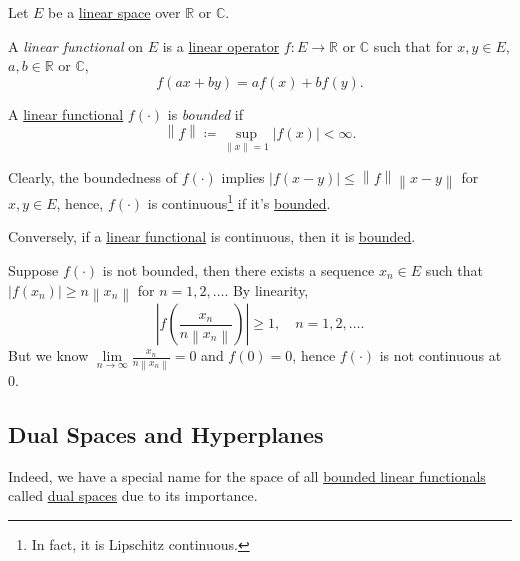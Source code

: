 \begin{definition*}
	Let \(E\) be a \hyperref[def:linear-vector-space]{linear space} over \(\mathbb{R} \) or \(\mathbb{C} \).
	\begin{definition}\label{def:linear-functional}
		A \emph{linear functional} on \(E\) is a \hyperref[def:linear-op]{linear operator} \(f\colon E\to \mathbb{R} \) or \(\mathbb{C} \) such that for \(x, y\in E\), \(a, b\in \mathbb{R} \) or \(\mathbb{C} \),
		\[
			f(ax + by) = af(x) + bf(y).
		\]
	\end{definition}
	\begin{definition}\label{def:bounded-linear-functional}
		A \hyperref[def:linear-functional]{linear functional} \(f(\cdot)\) is \emph{bounded} if
		\[
			\left\lVert f\right\rVert \coloneqq \sup _{\left\lVert x\right\rVert = 1}\left\vert f(x) \right\vert  < \infty.
		\]
	\end{definition}
\end{definition*}

Clearly, the boundedness of \(f(\cdot)\) implies \(\left\vert f(x-y) \right\vert \leq \left\lVert f\right\rVert \left\lVert x-y\right\rVert \) for \(x, y\in E\), hence, \(f(\cdot)\) is continuous\footnote{In fact, it is Lipschitz continuous.} if it's \hyperref[def:bounded-linear-functional]{bounded}.

\begin{remark}
	Conversely, if a \hyperref[def:linear-functional]{linear functional} is continuous, then it is \hyperref[def:bounded-linear-functional]{bounded}.
\end{remark}
\begin{explanation}
	Suppose \(f(\cdot)\) is not bounded, then there exists a sequence \(x_n\in E\) such that \(\left\vert f(x_n) \right\vert \geq n \left\lVert x_n\right\rVert \) for \(n = 1, 2, \ldots  \). By linearity,
	\[
		\left\vert f \left( \frac{x_{n} }{n \left\lVert x_{n} \right\rVert } \right) \right\vert \geq 1, \quad n = 1, 2, \ldots.
	\]
	But we know \(\lim\limits_{n \to \infty} \frac{x_{n} }{n \left\lVert x_{n} \right\rVert }=0\) and \(f(0) = 0\), hence \(f(\cdot)\) is not continuous at \(0\).
\end{explanation}

\subsection{Dual Spaces and Hyperplanes}
Indeed, we have a special name for the space of all \hyperref[def:bounded-linear-functional]{bounded linear functionals} called \hyperref[def:dual-space]{dual spaces} due to its importance.

